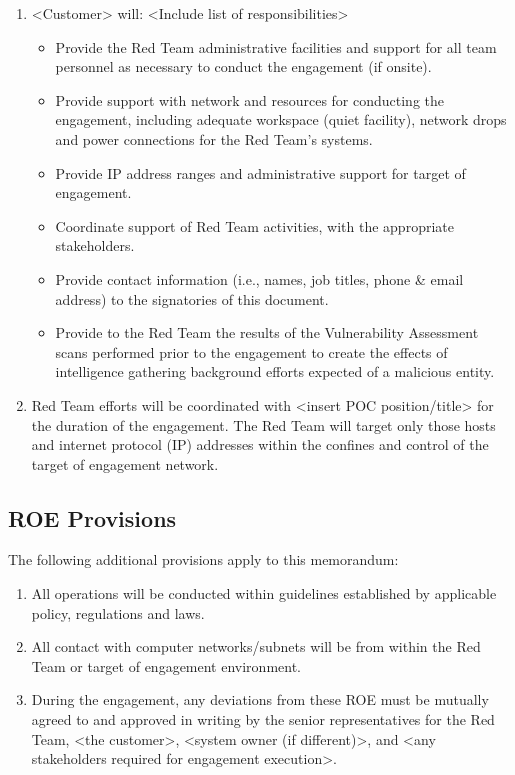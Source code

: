 \documentclass[12pt,letterpaper]{article}
\begin{document}
\begin{enumerate}[label=\alph*.]
    \item <Customer> will: <Include list of responsibilities>
    \begin{itemize}
        \item Provide the Red Team administrative facilities and support for all team personnel as necessary to conduct the engagement (if onsite).
        \item Provide support with network and resources for conducting the engagement, including adequate workspace (quiet facility), network drops and power connections for the Red Team's systems.
        \item Provide IP address ranges and administrative support for target of engagement.
        \item Coordinate support of Red Team activities, with the appropriate stakeholders.
        \item Provide contact information (i.e., names, job titles, phone \& email address) to the signatories of this document.
        \item Provide to the Red Team the results of the Vulnerability Assessment scans performed prior to the engagement to create the effects of intelligence gathering background efforts expected of a malicious entity.
    \end{itemize}
    
    \item Red Team efforts will be coordinated with <insert POC position/title> for the duration of the engagement. The Red Team will target only those hosts and internet protocol (IP) addresses within the confines and control of the target of engagement network.
    
\end{enumerate}

\subsection{ROE Provisions}
The following additional provisions apply to this memorandum:
\begin{enumerate}[label=\alph*.]
    \item All operations will be conducted within guidelines established by applicable policy, regulations and laws.
    
    \item All contact with computer networks/subnets will be from within the Red Team or target of engagement environment.
    
    \item During the engagement, any deviations from these ROE must be mutually agreed to and approved in writing by the senior representatives for the Red Team, <the customer>, <system owner (if different)>, and <any stakeholders required for engagement execution>.
\end{enumerate}
\end{document}
